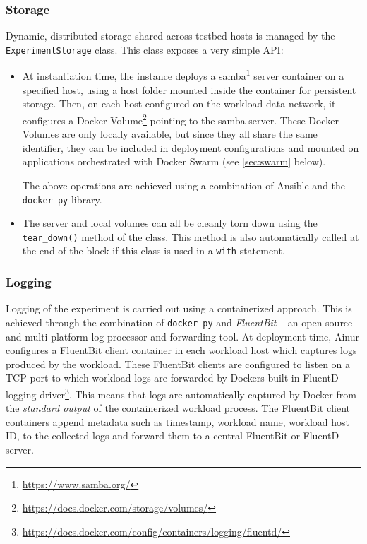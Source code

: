 \subsubsection{Storage}\label{sec:storage}

Dynamic, distributed storage shared across testbed hosts is managed by the \texttt{ExperimentStorage} class.
This class exposes a very simple \gls{API}:
\begin{itemize}
    \item At instantiation time, the instance deploys a samba\footnote{\url{https://www.samba.org/}} server container on a specified host, using a host folder mounted inside the container for persistent storage.
    Then, on each host configured on the workload data network, it configures a Docker Volume\footnote{\url{https://docs.docker.com/storage/volumes/}} pointing to the samba server.
    These Docker Volumes are only locally available, but since they all share the same identifier, they can be included in deployment configurations and mounted on applications orchestrated with Docker Swarm (see \cref{sec:swarm} below).

    The above operations are achieved using a combination of Ansible and the \texttt{docker-py} library.

    \item The server and local volumes can all be cleanly torn down using the \texttt{tear_down()} method of the class.
    This method is also automatically called at the end of the block if this class is used in a \texttt{with} statement.
\end{itemize}


\subsubsection{Logging}\label{sec:logging}

Logging of the experiment is carried out using a containerized approach.
This is achieved through the combination of \texttt{docker-py} and \textit{FluentBit} -- an open-source and multi-platform log processor and forwarding tool.
At deployment time, Ainur configures a FluentBit client container in each workload host which captures logs produced by the workload.
These FluentBit clients are configured to listen on a \gls{TCP} port to which workload logs are forwarded by Dockers built-in FluentD logging driver\footnote{\url{https://docs.docker.com/config/containers/logging/fluentd/}}.
This means that logs are automatically captured by Docker from the \emph{standard output} of the containerized workload process.
The FluentBit client containers append metadata such as timestamp, workload name, workload host ID, to the collected logs and forward them to a central FluentBit or FluentD server.

